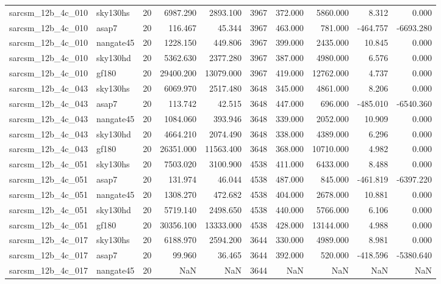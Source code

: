 \begin{longtable}{llrrrrrrrr}
sarcsm\_12b\_4c\_010 & sky130hs & 20 & 6987.290 & 2893.100 & 3967 & 372.000 & 5860.000 & 8.312 & 0.000 \\
sarcsm\_12b\_4c\_010 & asap7 & 20 & 116.467 & 45.344 & 3967 & 463.000 & 781.000 & -464.757 & -6693.280 \\
sarcsm\_12b\_4c\_010 & nangate45 & 20 & 1228.150 & 449.806 & 3967 & 399.000 & 2435.000 & 10.845 & 0.000 \\
sarcsm\_12b\_4c\_010 & sky130hd & 20 & 5362.630 & 2377.280 & 3967 & 387.000 & 4980.000 & 6.576 & 0.000 \\
sarcsm\_12b\_4c\_010 & gf180 & 20 & 29400.200 & 13079.000 & 3967 & 419.000 & 12762.000 & 4.737 & 0.000 \\
sarcsm\_12b\_4c\_043 & sky130hs & 20 & 6069.970 & 2517.480 & 3648 & 345.000 & 4861.000 & 8.206 & 0.000 \\
sarcsm\_12b\_4c\_043 & asap7 & 20 & 113.742 & 42.515 & 3648 & 447.000 & 696.000 & -485.010 & -6540.360 \\
sarcsm\_12b\_4c\_043 & nangate45 & 20 & 1084.060 & 393.946 & 3648 & 339.000 & 2052.000 & 10.909 & 0.000 \\
sarcsm\_12b\_4c\_043 & sky130hd & 20 & 4664.210 & 2074.490 & 3648 & 338.000 & 4389.000 & 6.296 & 0.000 \\
sarcsm\_12b\_4c\_043 & gf180 & 20 & 26351.000 & 11563.400 & 3648 & 368.000 & 10710.000 & 4.982 & 0.000 \\
sarcsm\_12b\_4c\_051 & sky130hs & 20 & 7503.020 & 3100.900 & 4538 & 411.000 & 6433.000 & 8.488 & 0.000 \\
sarcsm\_12b\_4c\_051 & asap7 & 20 & 131.974 & 46.044 & 4538 & 487.000 & 845.000 & -461.819 & -6397.220 \\
sarcsm\_12b\_4c\_051 & nangate45 & 20 & 1308.270 & 472.682 & 4538 & 404.000 & 2678.000 & 10.881 & 0.000 \\
sarcsm\_12b\_4c\_051 & sky130hd & 20 & 5719.140 & 2498.650 & 4538 & 440.000 & 5766.000 & 6.106 & 0.000 \\
sarcsm\_12b\_4c\_051 & gf180 & 20 & 30356.100 & 13333.000 & 4538 & 428.000 & 13144.000 & 4.988 & 0.000 \\
sarcsm\_12b\_4c\_017 & sky130hs & 20 & 6188.970 & 2594.200 & 3644 & 330.000 & 4989.000 & 8.981 & 0.000 \\
sarcsm\_12b\_4c\_017 & asap7 & 20 & 99.960 & 36.465 & 3644 & 392.000 & 520.000 & -418.596 & -5380.640 \\
sarcsm\_12b\_4c\_017 & nangate45 & 20 & NaN & NaN & 3644 & NaN & NaN & NaN & NaN \\

\end{longtable}

